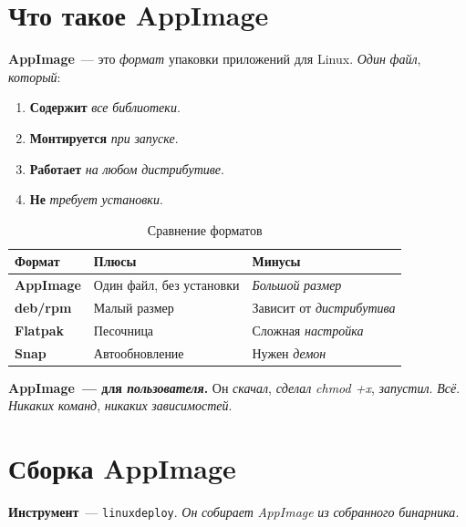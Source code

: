 \section{Что такое AppImage}
\label{sec:appimage-what}

\textbf{AppImage}~--- это \emph{формат} упаковки приложений
для Linux. \emph{Один} \emph{файл}, \emph{который}:
\begin{enumerate}
    \item \textbf{Содержит} \emph{все} \emph{библиотеки}.
    \item \textbf{Монтируется} \emph{при} \emph{запуске}.
    \item \textbf{Работает} \emph{на} \emph{любом} \emph{дистрибутиве}.
    \item \textbf{Не} \emph{требует} \emph{установки}.
\end{enumerate}

\begin{table}[htbp]
\centering
\caption{Сравнение форматов}
\label{tab:appimage-vs}
\small
\begin{tabularx}{\textwidth}{@{}l L L@{}}
\toprule
\textbf{Формат} & \textbf{Плюсы} & \textbf{Минусы} \\
\midrule
\textbf{AppImage} & Один файл, без установки & \emph{Большой} \emph{размер} \\
\textbf{deb/rpm}  & Малый размер & Зависит от \emph{дистрибутива} \\
\textbf{Flatpak}  & Песочница & Сложная \emph{настройка} \\
\textbf{Snap}     & Автообновление & Нужен \emph{демон} \\
\bottomrule
\end{tabularx}
\end{table}

\begin{keybox}
\textbf{AppImage~--- для \emph{пользователя}.} Он \emph{скачал},
\emph{сделал} \emph{chmod +x}, \emph{запустил}. \emph{Всё}.
\emph{Никаких} \emph{команд}, \emph{никаких} \emph{зависимостей}.
\end{keybox}

\section{Сборка AppImage}
\label{sec:appimage-build}

\textbf{Инструмент}~--- \texttt{linuxdeploy}. \emph{Он}
\emph{собирает} \emph{AppImage} \emph{из} \emph{собранного}
\emph{бинарника}.

